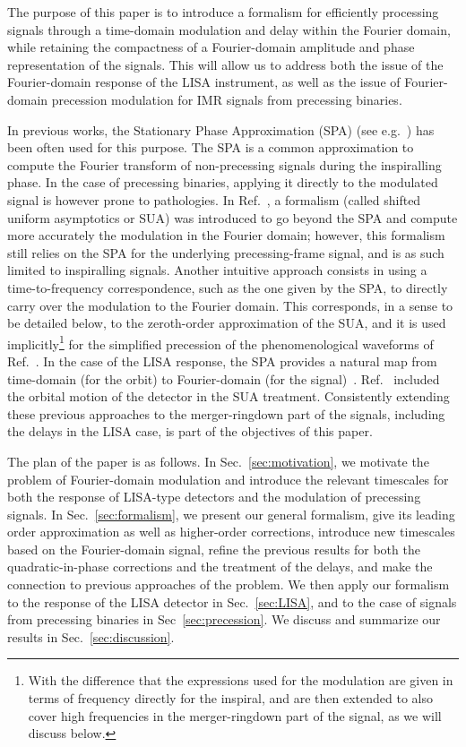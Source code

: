 \documentclass[aps,showpacs,twocolumn,
prd,superscriptaddress,nofootinbib]{revtex4-1}
\begin{document}
The purpose of this paper is to introduce a formalism for efficiently processing signals through a time-domain modulation and delay within the Fourier domain, while retaining the compactness of a Fourier-domain amplitude and phase representation of the signals. This will allow us to address both the issue of the Fourier-domain response of the LISA instrument, as well as the issue of Fourier-domain precession modulation for IMR signals from precessing binaries.

In previous works, the Stationary Phase Approximation (SPA) (see e.g.~\cite{Thorne300, CF94}) has been often used for this purpose. The SPA is a common approximation to compute the Fourier transform of non-precessing signals during the inspiralling phase. In the case of precessing binaries, applying it directly to the modulated signal is however prone to pathologies. In Ref.~\cite{KCY13,KCY14}, a formalism (called shifted uniform asymptotics or SUA) was introduced to go beyond the SPA and compute more accurately the modulation in the Fourier domain; however, this formalism still relies on the SPA for the underlying precessing-frame signal, and is as such limited to inspiralling signals. Another intuitive approach consists in using a time-to-frequency correspondence, such as the one given by the SPA, to directly carry over the modulation to the Fourier domain. This corresponds, in a sense to be detailed below, to the zeroth-order approximation of the SUA, and it is used implicitly\footnote{With the difference that the expressions used for the modulation are given in terms of frequency directly for the inspiral, and are then extended to also cover high frequencies in the merger-ringdown part of the signal, as we will discuss below.} for the simplified precession of the phenomenological waveforms of Ref.~\cite{Hannam+13}. In the case of the LISA response, the SPA provides a natural map from time-domain (for the orbit) to Fourier-domain (for the signal)~\cite{Cutler97}. Ref.~\cite{Klein+15} included the orbital motion of the detector in the SUA treatment. Consistently extending these previous approaches to the merger-ringdown part of the signals, including the delays in the LISA case, is part of the objectives of this paper.

The plan of the paper is as follows. In Sec.~\ref{sec:motivation}, we motivate the problem of Fourier-domain modulation and introduce the relevant timescales for both the response of LISA-type detectors and the modulation of precessing signals. In Sec.~\ref{sec:formalism}, we present our general formalism, give its leading order approximation as well as higher-order corrections, introduce new timescales based on the Fourier-domain signal, refine the previous results for both the quadratic-in-phase corrections and the treatment of the delays, and make the connection to previous approaches of the problem. We then apply our formalism to the response of the LISA detector in Sec.~\ref{sec:LISA}, and to the case of signals from precessing binaries in Sec~\ref{sec:precession}. We discuss and summarize our results in Sec.~\ref{sec:discussion}.
\end{document}
